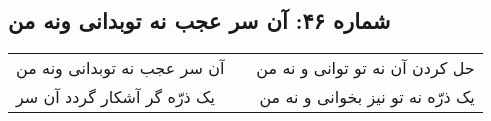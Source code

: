 \begin{center}
\section*{شماره ۴۶: آن سر عجب نه توبدانی ونه من}
\label{sec:046}
\begin{longtable}{l p{0.5cm} r}
آن سر عجب نه توبدانی ونه من
&&
حل کردن آن نه تو توانی و نه من
\\
یک ذرّه گر آشکار گردد آن سر
&&
یک ذرّه نه تو نیز بخوانی و نه من
\\
\end{longtable}
\end{center}
